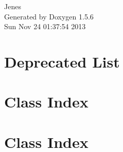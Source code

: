 \documentclass[a4paper]{book}
\begin{document}
\begin{titlepage}
\vspace*{7cm}
\begin{center}
{\Large Jenes }\\
\vspace*{1cm}
{\large Generated by Doxygen 1.5.6}\\
\vspace*{0.5cm}
{\small Sun Nov 24 01:37:54 2013}\\
\end{center}
\end{titlepage}
\clearemptydoublepage
{}
\tableofcontents
\clearemptydoublepage
{}
\chapter{Deprecated List}
\label{deprecated}
\hypertarget{deprecated}{}

\chapter{Class Index}

\chapter{Class Index}

\end{document}
